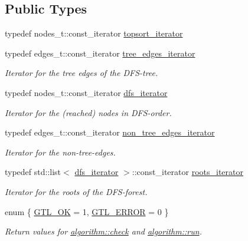 \subsection*{Public Types}
\begin{DoxyCompactItemize}
\item 
typedef nodes\+\_\+t\+::const\+\_\+iterator \mbox{\hyperlink{classtopsort_a04a42f813522640e17dddbaeb55498e4}{topsort\+\_\+iterator}}
\item 
typedef edges\+\_\+t\+::const\+\_\+iterator \mbox{\hyperlink{classdfs_accde8d5403404f6d22fe4756d4ffedd5}{tree\+\_\+edges\+\_\+iterator}}
\begin{DoxyCompactList}\small\item\em Iterator for the tree edges of the D\+F\+S-\/tree. \end{DoxyCompactList}\item 
typedef nodes\+\_\+t\+::const\+\_\+iterator \mbox{\hyperlink{classdfs_a15fe023a5a1f7ddda00f3d87110d9a32}{dfs\+\_\+iterator}}
\begin{DoxyCompactList}\small\item\em Iterator for the (reached) nodes in D\+F\+S-\/order. \end{DoxyCompactList}\item 
typedef edges\+\_\+t\+::const\+\_\+iterator \mbox{\hyperlink{classdfs_a95e353f354d3b31daded0c4fe749171a}{non\+\_\+tree\+\_\+edges\+\_\+iterator}}
\begin{DoxyCompactList}\small\item\em Iterator for the non-\/tree-\/edges. \end{DoxyCompactList}\item 
typedef std\+::list$<$ \mbox{\hyperlink{classdfs_a15fe023a5a1f7ddda00f3d87110d9a32}{dfs\+\_\+iterator}} $>$\+::const\+\_\+iterator \mbox{\hyperlink{classdfs_a1ea6e8eb2766ac95ac48a8523359065a}{roots\+\_\+iterator}}
\begin{DoxyCompactList}\small\item\em Iterator for the roots of the D\+F\+S-\/forest. \end{DoxyCompactList}\item 
enum \{ \mbox{\hyperlink{classalgorithm_af1a0078e153aa99c24f9bdf0d97f6710a5114c20e4a96a76b5de9f28bf15e282b}{G\+T\+L\+\_\+\+OK}} = 1, 
\mbox{\hyperlink{classalgorithm_af1a0078e153aa99c24f9bdf0d97f6710a6fcf574690bbd6cf710837a169510dd7}{G\+T\+L\+\_\+\+E\+R\+R\+OR}} = 0
 \}
\begin{DoxyCompactList}\small\item\em Return values for \mbox{\hyperlink{classalgorithm_a76361fb03ad1cf643affc51821e43bed}{algorithm\+::check}} and \mbox{\hyperlink{classalgorithm_a734b189509a8d6b56b65f8ff772d43ca}{algorithm\+::run}}. \end{DoxyCompactList}\end{DoxyCompactItemize}
